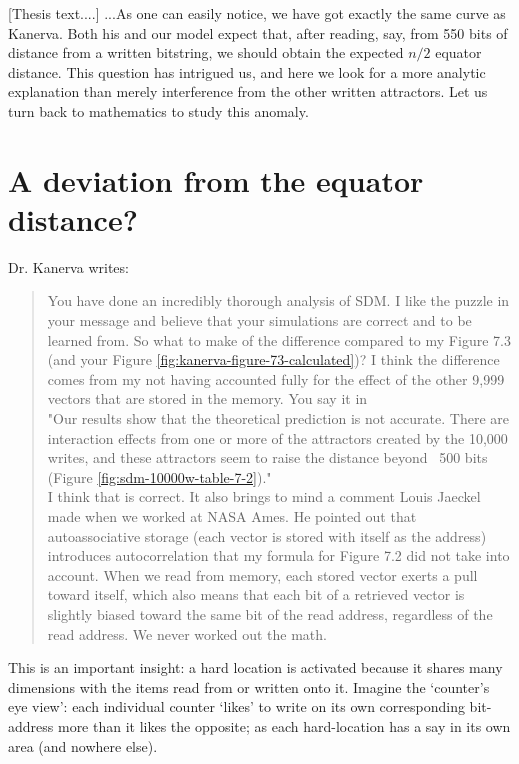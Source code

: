 \documentclass[12pt]{article}
\begin{document}
[Thesis text....] ...As one can easily notice, we have got exactly the same curve as Kanerva. Both his and our model expect that, after reading, say, from 550 bits of distance from a written bitstring, we should obtain the expected $n/2$ equator distance. This question has intrigued us, and here we look for a more analytic explanation than merely interference from the other written attractors. Let us turn back to mathematics to study this anomaly.

\section{A deviation from the equator distance?}

Dr. Kanerva writes:

\begin{quote}
    You have done an incredibly thorough analysis of SDM. I like the puzzle in your message and believe that your simulations are correct and to be learned from.  So what to make of the difference compared to my Figure 7.3 (and your Figure \ref{fig:kanerva-figure-73-calculated})?  I think the difference comes from my not having accounted fully for the effect of the other 9,999 vectors that are stored in the memory.  You say it in \\

   "Our results show that the theoretical prediction is not accurate. There are interaction effects from one or more of the attractors created by the 10,000 writes, and these attractors seem to raise the distance beyond ~500 bits
   (Figure \ref{fig:sdm-10000w-table-7-2})." \\

   I think that is correct.  It also brings to mind a comment Louis Jaeckel made when we worked at NASA Ames.  He pointed out that autoassociative storage (each vector is stored with itself as the address) introduces autocorrelation that my formula for Figure 7.2 did not take into account.  When we read from memory, each stored vector exerts a pull toward itself, which also means that each bit of a retrieved vector is slightly biased toward the same bit of the read address, regardless of the read address.  We never worked out the math.
\end{quote}

This is an important insight: a hard location is activated because it shares many dimensions with the items read from or written onto it. Imagine the `counter's eye view':  each individual counter `likes' to write on its own corresponding bit-address more than it likes the opposite; as each hard-location has a say in its own area (and nowhere else).
\end{document}
